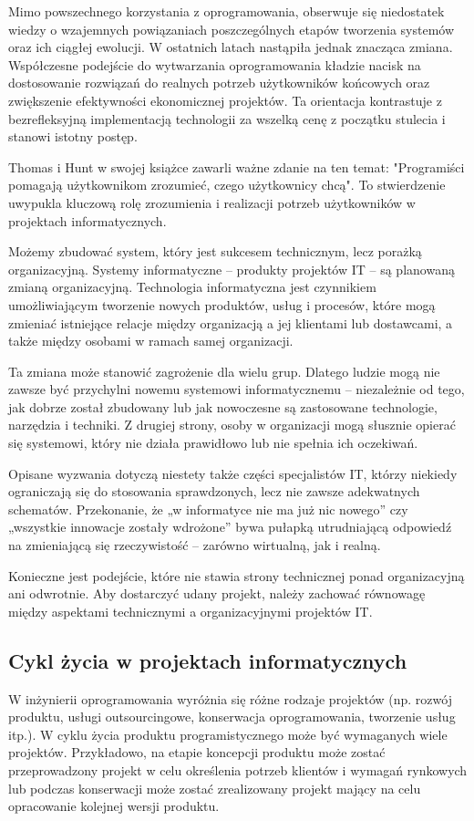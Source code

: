 Mimo powszechnego korzystania z oprogramowania, obserwuje się niedostatek wiedzy o wzajemnych powiązaniach poszczególnych etapów tworzenia systemów oraz ich ciągłej ewolucji. W ostatnich latach nastąpiła jednak znacząca zmiana. Współczesne podejście do wytwarzania oprogramowania kładzie nacisk na dostosowanie rozwiązań do realnych potrzeb użytkowników końcowych oraz zwiększenie efektywności ekonomicznej projektów. Ta orientacja kontrastuje z bezrefleksyjną implementacją technologii za wszelką cenę z początku stulecia i stanowi istotny postęp. \autocite{ITPMChmielarz}

Thomas i Hunt w swojej książce zawarli ważne zdanie na ten temat: "Programiści pomagają użytkownikom zrozumieć, czego użytkownicy chcą". \autocite{pragmatic} To stwierdzenie uwypukla kluczową rolę zrozumienia i realizacji potrzeb użytkowników w projektach informatycznych.

Możemy zbudować system, który jest sukcesem technicznym, lecz porażką organizacyjną. Systemy informatyczne – produkty projektów IT – są planowaną zmianą organizacyjną. Technologia informatyczna jest czynnikiem umożliwiającym tworzenie nowych produktów, usług i procesów, które mogą zmieniać istniejące relacje między organizacją a jej klientami lub dostawcami, a także między osobami w ramach samej organizacji.  

Ta zmiana może stanowić zagrożenie dla wielu grup. Dlatego ludzie mogą nie zawsze być przychylni nowemu systemowi informatycznemu – niezależnie od tego, jak dobrze został zbudowany lub jak nowoczesne są zastosowane technologie, narzędzia i techniki. Z drugiej strony, osoby w organizacji mogą słusznie opierać się systemowi, który nie działa prawidłowo lub nie spełnia ich oczekiwań. \autocite{ITPMMarchewka}

Opisane wyzwania dotyczą niestety także części specjalistów IT, którzy niekiedy ograniczają się do stosowania sprawdzonych, lecz nie zawsze adekwatnych schematów. Przekonanie, że „w informatyce nie ma już nic nowego” czy „wszystkie innowacje zostały wdrożone” bywa pułapką utrudniającą odpowiedź na zmieniającą się rzeczywistość – zarówno wirtualną, jak i realną. \autocite{ITPMChmielarz}

Konieczne jest podejście, które nie stawia strony technicznej ponad organizacyjną ani odwrotnie. Aby dostarczyć udany projekt, należy zachować równowagę między aspektami technicznymi a organizacyjnymi projektów IT. \autocite{ITPMMarchewka}

\subsection{Cykl życia w projektach informatycznych}
W inżynierii oprogramowania wyróżnia się różne rodzaje projektów (np. rozwój produktu, usługi outsourcingowe, konserwacja oprogramowania, tworzenie usług itp.). W cyklu życia produktu programistycznego może być wymaganych wiele projektów. Przykładowo, na etapie koncepcji produktu może zostać przeprowadzony projekt w celu określenia potrzeb klientów i wymagań rynkowych lub podczas konserwacji może zostać zrealizowany projekt mający na celu opracowanie kolejnej wersji produktu. \autocite{swebok}

